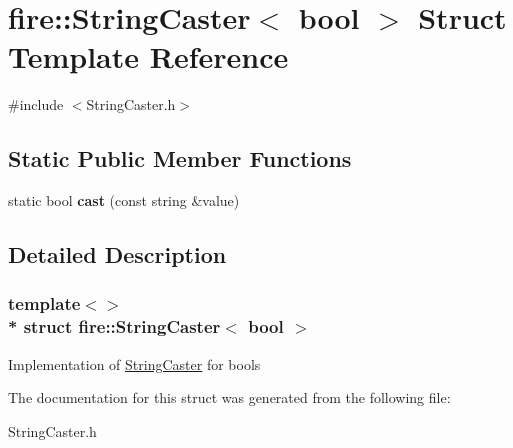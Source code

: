 \hypertarget{a00030}{}\section{fire\+:\+:String\+Caster$<$ bool $>$ Struct Template Reference}
\label{a00030}


{\ttfamily \#include $<$String\+Caster.\+h$>$}

\subsection*{Static Public Member Functions}
\begin{DoxyCompactItemize}
\item 
static bool {\bfseries cast} (const string \&value)\hypertarget{a00030_a852e5b28ba000a44312d3ebcb3703e48}{}\label{a00030_a852e5b28ba000a44312d3ebcb3703e48}

\end{DoxyCompactItemize}


\subsection{Detailed Description}
\subsubsection*{template$<$$>$\\*
struct fire\+::\+String\+Caster$<$ bool $>$}

Implementation of \hyperlink{a00029}{String\+Caster} for bools 

The documentation for this struct was generated from the following file\+:\begin{DoxyCompactItemize}
\item 
String\+Caster.\+h\end{DoxyCompactItemize}
